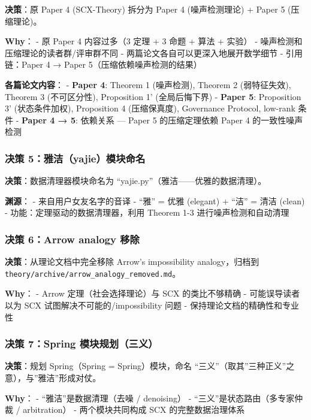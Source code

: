 \documentclass[
  12pt,
]{ctexart}
\begin{document}
\textbf{决策}：原 Paper 4 (SCX-Theory) 拆分为 Paper 4 (噪声检测理论) +
Paper 5 (压缩理论)。

\textbf{Why}： - 原 Paper 4 内容过多（3 定理 + 3 命题 + 算法 + 实验） -
噪声检测和压缩理论的读者群/评审群不同 -
两篇论文各自可以更深入地展开数学细节 - 引用链：Paper 4 → Paper
5（压缩依赖噪声检测的结果）

\textbf{各篇论文内容}： - \textbf{Paper 4}: Theorem 1 (噪声检测),
Theorem 2 (弱特征失效), Theorem 3 (不可区分性), Proposition 1'
(全局后悔下界) - \textbf{Paper 5}: Proposition 3' (状态条件加权),
Proposition 4 (压缩保真度), Governance Protocol, low-rank 条件 -
\textbf{Paper 4 → 5}: 依赖关系 --- Paper 5 的压缩定理依赖 Paper 4
的一致性噪声检测

\subsubsection{决策
5：雅洁（yajie）模块命名}\label{ux51b3ux7b56-5ux96c5ux6d01yajieux6a21ux5757ux547dux540d}

\textbf{决策}：数据清理器模块命名为
``yajie.py''（雅洁------优雅的数据清理）。

\textbf{渊源}： - 来自用户女友名字的音译 - ``雅'' = 优雅 (elegant) +
``洁'' = 清洁 (clean) - 功能：定理驱动的数据清理器，利用 Theorem 1-3
进行噪声检测和自动清理

\subsubsection{决策 6：Arrow analogy
移除}\label{ux51b3ux7b56-6arrow-analogy-ux79fbux9664}

\textbf{决策}：从理论文档中完全移除 Arrow's impossibility
analogy，归档到 \texttt{theory/archive/arrow\_analogy\_removed.md}。

\textbf{Why}： - Arrow 定理（社会选择理论）与 SCX 的类比不够精确 -
可能误导读者以为 SCX 试图解决不可能的/impossibility 问题 -
保持理论文档的精确性和专业性

\subsubsection{决策 7：Spring
模块规划（三义）}\label{ux51b3ux7b56-7spring-ux6a21ux5757ux89c4ux5212ux4e09ux4e49}

\textbf{决策}：规划 Spring（Spring = Spring）模块，命名
``三义''（取其''三种正义''之意），与''雅洁''形成对仗。

\textbf{Why}： - ``雅洁''是数据清理（去噪 / denoising） -
``三义''是状态路由（多专家仲裁 / arbitration） - 两个模块共同构成 SCX
的完整数据治理体系
\end{document}
